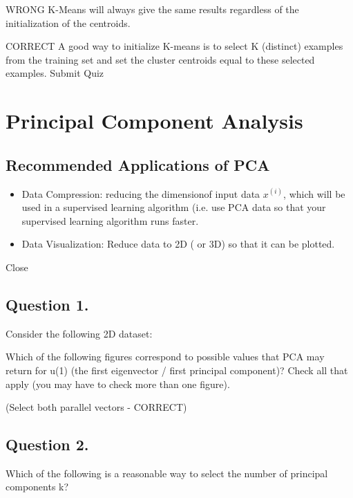\documentclass[11pt]{article} %
\begin{document}
	WRONG K-Means will always give the same results regardless of the initialization of the centroids.
	
	CORRECT A good way to initialize K-means is to select K (distinct) examples from the training set and set the cluster centroids equal to these selected examples.
	Submit Quiz
	
	

\section{Principal Component Analysis}
\subsection{Recommended Applications of PCA}

\begin{itemize}
	\item Data Compression: reducing the dimensionof input data $x^{(i)}$, which will be used in a supervised learning algorithm
	(i.e. use PCA data so that your supervised learning algorithm runs faster.
	
	\item Data Visualization: Reduce data to 2D ( or 3D) so that it can be plotted.
\end{itemize}
Close

\subsection{ Question 1. }

Consider the following 2D dataset:


Which of the following figures correspond to possible values that PCA may return for u(1) (the first eigenvector / first principal component)? 
Check all that apply (you may have to check more than one figure).

(Select both parallel vectors - CORRECT)








\subsection{ Question 2. }
Which of the following is a reasonable way to select the number of principal components k?
\end{document}
